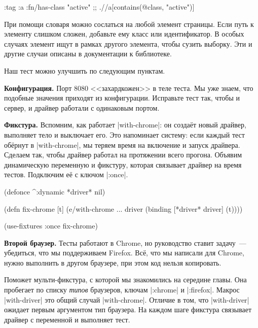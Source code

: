 \begin{english}
  \begin{clojure}
{:tag :a :fn/has-class "active"}
;; .//a[contains(@class, "active")]
  \end{clojure}
\end{english}

При помощи словаря можно сослаться на любой элемент страницы. Если путь к
элементу слишком сложен, добавьте ему класс или идентификатор. В особых случаях
элемент ищут в рамках другого элемента, чтобы сузить выборку. Эти и другие
случаи описаны в документации к библиотеке.

Наш тест можно улучшить по следующим пунктам.

\textbf{Конфигурация.} Порт 8080 <<захардкожен>> в теле теста. Мы уже знаем, что
подобные значения приходят из конфигурации. Исправьте тест так, чтобы и сервер,
и драйвер работали с одинаковым портом.


\textbf{Фикстура.} Вспомним, как работает \spverb|with-chrome|: он создаёт новый
драйвер, выполняет тело и выключает его. Это напоминает систему: если каждый
тест обёрнут в \spverb|with-chrome|, мы теряем время на включение и запуск
драйвера. Сделаем так, чтобы драйвер работал на протяжении всего
прогона. Объявим динамическую переменную и фикстуру, которая связывает драйвер
на время тестов. Подключим её с ключом \spverb|:once|.

\begin{english}
  \begin{clojure}
(defonce ^:dynamic *driver* nil)

(defn fix-chrome [t]
  (e/with-chrome {...} driver
    (binding [*driver* driver]
      (t))))

(use-fixtures :once fix-chrome)
  \end{clojure}
\end{english}

\textbf{Второй браузер.} Тесты работают в Chrome, но руководство ставит
задачу~--- убедиться, что мы поддерживаем Firefox. Всё, что мы написали для
Chrome, нужно выполнить в другом браузере, при этом код нельзя копировать.

Поможет мульти-фикстура, с которой мы знакомились на середине главы. Она
пробегает по списку \emph{типов} браузеров, ключам \spverb|:chrome| и
\spverb|:firefox|. Макрос \spverb|with-driver| это общий случай
\spverb|with-chrome|. Отличие в том, что \spverb|with-driver| ожидает первым
аргументом тип браузера. На каждом шаге фикстура связывает драйвер с переменной
и выполняет тест.

